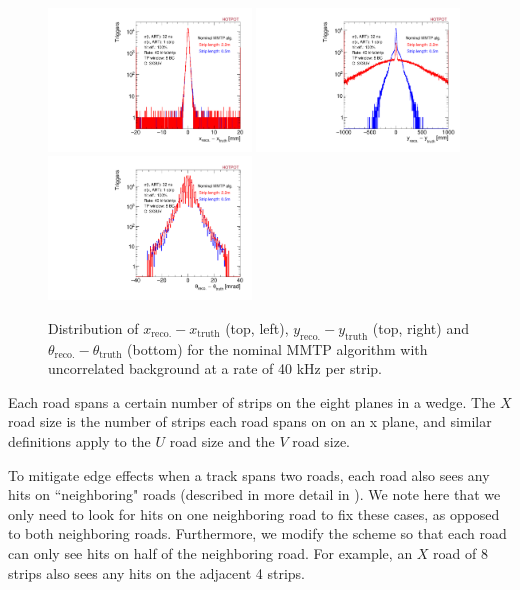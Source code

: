 \begin{figure}[!htpb]
  \begin{center}
    \includegraphics[width=0.48\textwidth]{figures/xres_old.pdf}
    \includegraphics[width=0.48\textwidth]{figures/yres_old.pdf}
    \includegraphics[width=0.48\textwidth]{figures/mres_old.pdf}
  \end{center}
  \vspace{-10pt}
  \caption{Distribution of $x_\text{reco.} - x_\text{truth}$ (top, left), $y_\text{reco.} - y_\text{truth}$ (top, right) and $\theta_\text{reco.} - \theta_\text{truth}$ (bottom) for the nominal MMTP algorithm with uncorrelated background at a rate of 40 kHz per strip.}
  \label{fig:resolutions_old}
\end{figure}
\par Each road spans a certain number of strips on the eight planes in a wedge. The $X$ road size is the number of strips each road spans on on an x plane, and similar definitions apply to the $U$ road size and the $V$ road size. \par To mitigate edge effects when a track spans two roads, each road also sees any hits on ``neighboring" roads (described in more detail in \cite{mmtp}). We note here that we only need to look for hits on one neighboring road to fix these cases, as opposed to both neighboring roads. Furthermore, we modify the scheme so that each road can only see hits on half of the neighboring road. For example, an $X$ road of 8 strips also sees any hits on the adjacent 4 strips. 
